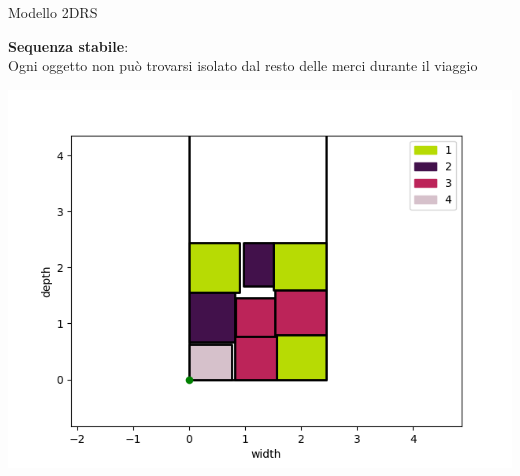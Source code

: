 \documentclass{beamer}
\begin{document}
\begin{frame}{Modello 2DRS}
	\begin{minipage}[c]{0.45\textwidth}
		\textbf{Sequenza stabile}:\\ Ogni oggetto non pu\`o trovarsi isolato dal resto delle merci durante il viaggio
	\end{minipage}
	\hfill
	\begin{minipage}[c]{0.45\textwidth}
		\includegraphics[width=1\linewidth]{figures/2d3d}
	\end{minipage}
\end{frame}
\end{document}
